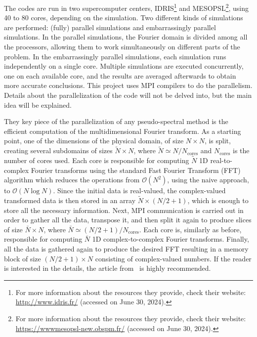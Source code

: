 \documentclass[../main.tex]{subfiles}
\begin{document}
The codes are run in two supercomputer centers, IDRIS\footnote{For more information about the resources they provide, check their website: \url{http://www.idris.fr/} (accessed on June 30, 2024).} and MESOPSL\footnote{For more information about the resources they provide, check their website: \url{https://wwwmesopsl-new.obspm.fr/} (accessed on June 30, 2024).}, using 40 to 80 cores, depending on the simulation. Two different kinds of simulations are performed: (fully) parallel simulations and embarrassingly parallel simulations. In the parallel simulations, the Fourier domain is divided among all the processors, allowing them to work simultaneously on different parts of the problem. In the embarrassingly parallel simulations, each simulation runs independently on a single core. Multiple simulations are executed concurrently, one on each available core, and the results are averaged afterwards to obtain more accurate conclusions. This project uses MPI compilers to do the parallelism. Details about the parallelization of the code will not be delved into, but the main idea will be explained.

They key piece of the parallelization of any pseudo-spectral method is the efficient computation of the multidimensional Fourier transform. As a starting point, one of the dimensions of the physical domain, of size $N\times N$, is split, creating several subdomains of sizes $\tilde{N}\times N$, where $\tilde{N} \simeq N/N_\mathrm{cores}$ and $N_\mathrm{cores}$ is the number of cores used. Each core is responsible for computing $\tilde{N}$ 1D real-to-complex Fourier transforms using the standard Fast Fourier Transform (FFT) algorithm which reduces the operations from $\mathcal{O}(N^2)$, using the naive approach, to $\mathcal{O}(N\log N)$. Since the initial data is real-valued, the complex-valued transformed data is then stored in an array $\tilde{N}\times (N/2 + 1)$, which is enough to store all the necessary information. Next, MPI communication is carried out in order to gather all the data, transpose it, and then split it again to produce slices of size $\bar{N}\times N$, where $\bar{N} \simeq (N/2 + 1)/N_\mathrm{cores}$. Each core is, similarly as before, responsible for computing $\bar{N}$ 1D complex-to-complex Fourier transforms. Finally, all the data is gathered again to produce the desired FFT resulting in a memory block of size $(N/2 + 1)\times N$ consisting of complex-valued numbers. If the reader is interested in the details, the article from~\cite{mpi} is highly recommended.
\end{document}
